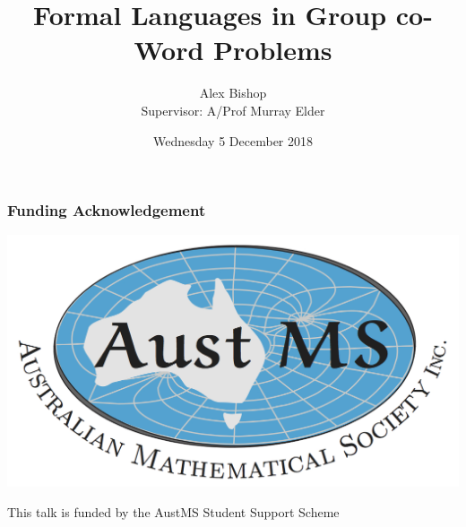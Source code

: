 \documentclass[11pt]{beamer}
\begin{document}
\author{Alex Bishop\\\vspace{.6em}Supervisor: A/Prof Murray Elder}
\title{Formal Languages in Group co-Word Problems}
\date{Wednesday 5 December 2018}%
\begin{frame}[plain]
	\maketitle
\end{frame}


\begin{frame}
\frametitle{Funding Acknowledgement}
\begin{center}
	\includegraphics[width=0.8\linewidth]{figure/austms}
	
	\vspace{2em}
	
	\large
	This talk is funded by the AustMS Student Support Scheme
\end{center}
\end{frame}

\end{document}
